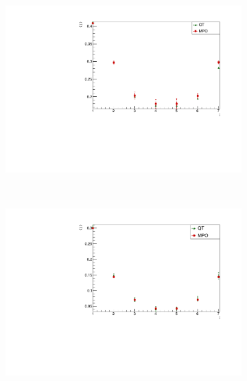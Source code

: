 \begin{figure}
    \centering
        \begin{subfigure}{\columnwidth}
        \centering
        \includegraphics[scale=0.5]{Figures/SpinCurrComparison_8sJ10505.pdf}
        \label{fig:SpinCurrComparison_8sJ10505}
        \end{subfigure}\\
        \begin{subfigure}{\columnwidth}
        \centering
        \includegraphics[scale=0.5]{Figures/SpinCurrComparison_8sJ1051.pdf}
        \label{fig:SpinCurrComparison_8sJ1051}
        \end{subfigure}\\
        \begin{subfigure}{\columnwidth}
        \centering

\end{subfigure}
\end{figure}
